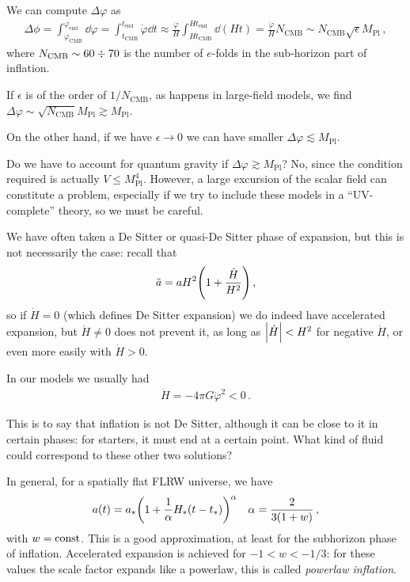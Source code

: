 \documentclass[main.tex]{subfiles}
\begin{document}
We can compute \(\Delta \varphi \) as 
%
\begin{align}
\Delta  \phi = \int_{\varphi _{\text{CMB}}}^{\varphi _{\text{end}}} \dd{\varphi } = \int_{t _{\text{CMB}}}^{t _{\text{end}}} \dot{\varphi} \dd{t} \approx \frac{\dot{\varphi}}{H} \int_{H t _{\text{CMB}}}^{H t _{\text{end}}} \dd{(Ht)} = \frac{\dot{\varphi}}{H} 
N _{\text{CMB}} \sim N _{\text{CMB}} \sqrt{\epsilon } M _{\text{Pl}}
\,,
\end{align}
%
where \(N _{\text{CMB}} \sim 60 \divisionsymbol 70\) is the number of \(e\)-folds in the sub-horizon part of inflation. 

If \(\epsilon \) is of the order of \(1 / N _{\text{CMB}}\), as happens in large-field models, we find \(\Delta \varphi \sim \sqrt{N _{\text{CMB}}} M _{\text{Pl}} \gtrsim M _{\text{Pl}}\).


On the other hand, if we have \(\epsilon \to 0\) we can have smaller \(\Delta \varphi \lesssim M _{\text{Pl}}\). 

Do we have to account for quantum gravity if \(\Delta \varphi \gtrsim M _{\text{Pl}}\)? No, since the condition required is actually \(V \leq M _{\text{Pl}}^{4}\).
However, a large excursion of the scalar field can constitute a problem, especially if we try to include these models in a ``UV-complete'' theory, so we must be careful.

We have often taken a De Sitter or quasi-De Sitter phase of expansion, but this is not necessarily the case: recall that 
%
\begin{align}
\ddot{a} = a H^2 \qty(1 + \frac{\dot{H}}{H^2})
\,,
\end{align}
%
so if \(\dot{H} = 0\) (which defines De Sitter expansion) we do indeed have accelerated expansion, but \(\dot{H} \neq 0 \) does not prevent it, as long as \(\abs{\dot{H}} < H^2\) for negative \(\dot{H}\), or even more easily with \(\dot{H} > 0\). 

In our models we usually had 
%
\begin{align}
\dot{H} = - 4 \pi G \dot{\varphi}^2 < 0
\,.
\end{align}

This is to say that inflation is not De Sitter, although it can be close to it in certain phases: for starters, it must end at a certain point. 
What kind of fluid could correspond to these other two solutions? 

In general, for a spatially flat FLRW universe, we have 
%
\begin{align}
a(t) = a_* \qty(1 + \frac{1}{\alpha } H_*(t- t_*))^{\alpha }
&& \alpha = \frac{2}{3 (1+w)}
\,,
\end{align}
%
with \(w = \text{const}\). This is a good approximation, at least for the subhorizon phase of inflation.
Accelerated expansion is achieved for \(-1 < w < - 1/3\): for these values the scale factor expands like a powerlaw, this is called \emph{powerlaw inflation}. 
\end{document}
